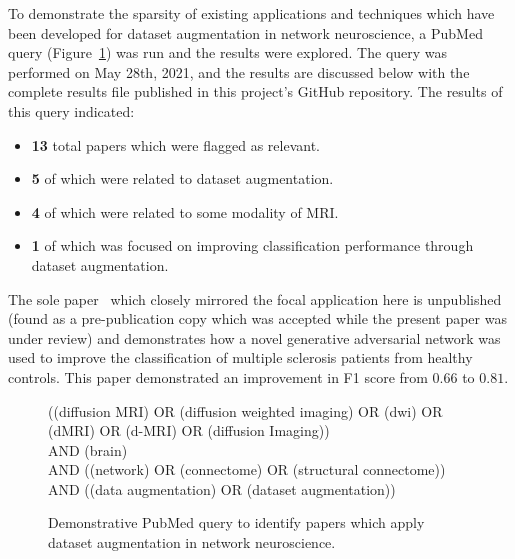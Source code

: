 \documentclass[10pt]{SelfArx} %
\begin{document}
To demonstrate the sparsity of existing applications and techniques which have been developed for dataset augmentation
in network neuroscience, a PubMed query (Figure~\ref{pubmedquery}) was run and the results were explored. The query was
performed on May 28th, 2021, and the results are discussed below with the complete results file published in this
project's GitHub repository. The results of this query indicated:

\begin{itemize}
\item \textbf{13} total papers which were flagged as relevant.
\item \textbf{5} of which were related to dataset augmentation.
\item \textbf{4} of which were related to some modality of MRI.
\item \textbf{1} of which was focused on improving classification performance through dataset augmentation.
\end{itemize}

The sole paper~\cite{barile2021data} which closely mirrored the focal application here is unpublished (found as a
pre-publication copy which was accepted while the present paper was under review) and demonstrates how a novel
generative adversarial network was used to improve the classification of multiple sclerosis patients from healthy
controls. This paper demonstrated an improvement in F1 score from $0.66$ to $0.81$.

\begin{figure}[h!]
\begin{tcolorbox}\centering
((diffusion MRI) OR (diffusion weighted imaging) OR (dwi) OR (dMRI) OR (d-MRI) OR (diffusion Imaging))\\
AND (brain)\\
AND ((network) OR (connectome) OR (structural connectome))\\
AND ((data augmentation) OR (dataset augmentation))
\end{tcolorbox}
\caption{Demonstrative PubMed query to identify papers which apply dataset augmentation in network neuroscience.}
\label{pubmedquery}
\end{figure}
\end{document}
